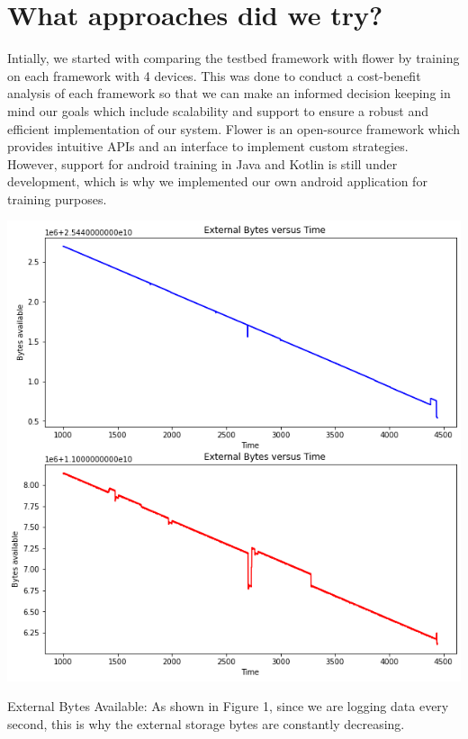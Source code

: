 \graphicspath{ {./images/} }

\section{What approaches did we try?}
    Intially, we started with comparing the testbed framework with flower by training
    on each framework with 4 devices. This was done to conduct a cost-benefit analysis
    of each framework so that we can make an informed decision keeping in mind our goals
    which include scalability and support to ensure a robust and efficient implementation of our system. Flower is an open-source framework which provides intuitive APIs and an interface to implement custom strategies. However, support for android training in Java and Kotlin is still under development, which is why we implemented our own android application for training purposes. \\

    \begin{table}[h]
    \includegraphics[scale=0.38]{extbytesvstime}
    \caption{External Bytes Available: As shown in Figure 1, since we are logging data every second, this is why the external storage bytes are constantly decreasing.}
    \end{table}
    
